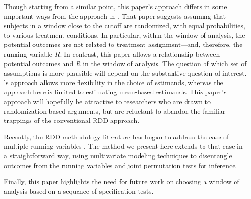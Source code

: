 \documentclass[12pt]{article}
\begin{document}
Though starting from a similar point, this paper's approach differs in
some important ways from the approach in \citet{rocio}.
That paper suggests assuming that subjects in a window close to the
cutoff are randomized, with equal probabilities, to various treatment
conditions.
In particular, within the window of analysis, the potential outcomes
are not related to treatment assignment---and, therefore, the running
variable $R$.
In contrast, this paper allows a relationship between potential
outcomes and $R$ in the window of analysis.
The question of which set of assumptions is more plausible will depend
on the substantive question of interest.
\citet{rocio}'s approach allows more flexibility in the choice of
estimands, whereas the approach here is limited to estimating
mean-based estimands.
This paper's approach will hopefully be attractive to researchers who
are drawn to randomization-based arguments, but are reluctant to
abandon the familiar trappings of the conventional RDD approach.

Recently, the RDD methodology literature has begun to address the case
of multiple running variables \citep{papay2011extending,
  reardon2012regression}.
The method we present here extends to that case in a straightforward
way, using multivariate modeling techniques to disentangle outcomes
from the running variables and joint permutation tests for inference.

Finally, this paper highlights the need for future work on choosing a
window of analysis based on a sequence of specification tests.



\end{document}

